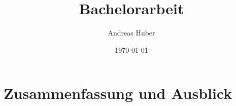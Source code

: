 \documentclass[a4paper,12pt]{article}
\title{Bachelorarbeit}
\author{Andreas Huber}
\date{\today}
\begin{document}

\newpage


\tableofcontents
\newpage




\newpage


\newpage


\newpage


\newpage


\section{Zusammenfassung und Ausblick}\label{zusammenfassung-u-ausblick}
\newpage

\setcounter{page}{3}


\newpage


\newpage
\end{document}
